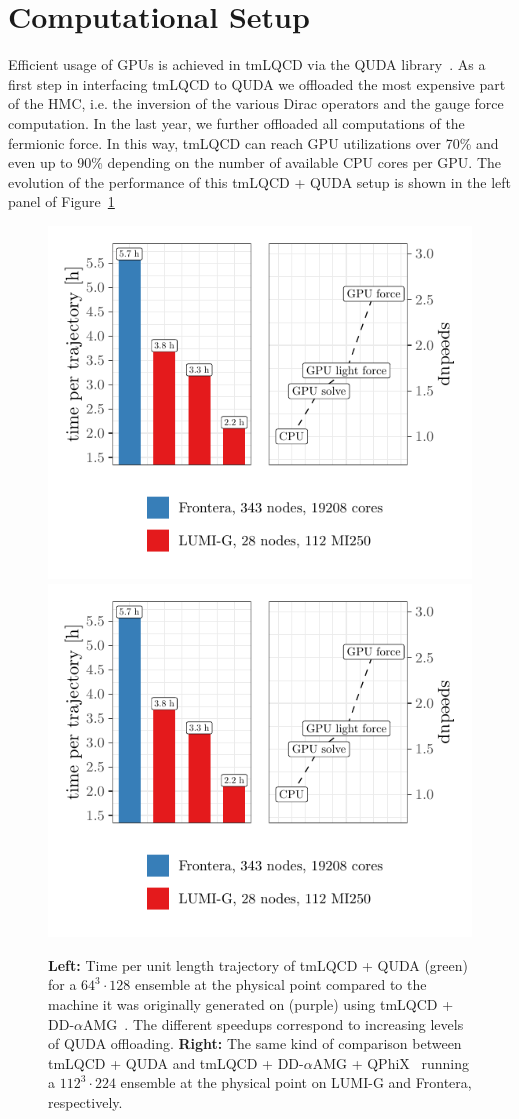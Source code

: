 \documentclass[a4paper,11pt]{article}
\begin{document}
\section{Computational Setup}

Efficient usage of GPUs is achieved in tmLQCD via the QUDA library~\cite{Clark:2009wm,Babich:2011np}. As a first step in interfacing tmLQCD to QUDA \cite{Kostrzewa:2022hsv}  we offloaded the most expensive part of the HMC, i.e. the inversion of the various Dirac operators and the gauge force computation. In the last year, we further offloaded all computations of the fermionic force. In this way, tmLQCD can reach GPU utilizations over 70\% and even up to 90\% depending on the number of available CPU cores per GPU.
The evolution of the performance of this tmLQCD + QUDA setup is shown in the left panel of Figure~\ref{fig:quda_speedup}

\begin{figure}
  \includegraphics[width=0.5\linewidth,page=2]{plots/quda_speedup}
  \includegraphics[width=0.5\linewidth,page=1]{plots/quda_speedup}
  \caption{\textbf{Left:} Time per unit length trajectory of tmLQCD + QUDA (green) for a $64^3 \cdot 128$ ensemble at the physical point compared to the machine it was originally generated on (purple) using tmLQCD + DD-$\alpha$AMG~\cite{Alexandrou:2016izb}. The different speedups correspond to increasing levels of QUDA offloading. \textbf{Right:} The same kind of comparison between tmLQCD + QUDA and tmLQCD + DD-$\alpha$AMG + QPhiX~\cite{QPhiX,Schrock:2015gik,QPhiX-github} running a $112^3 \cdot 224$ ensemble at the physical point on LUMI-G and Frontera, respectively.}
  \label{fig:quda_speedup}
\end{figure}
\end{document}
